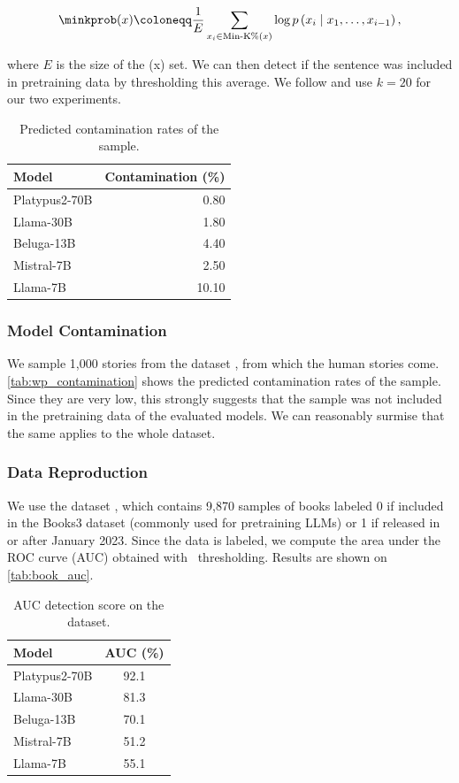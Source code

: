 \[ \minkprob (x) \coloneqq \frac{1}{E} \sum_{x_i \in \textrm{Min-K\%}(x)} \log p \left(x_i \mid x_1, \dots, x_{i-1} \right) ,\]

where $E$ is the size of the \mink(x) set. We can then detect if the sentence was included in pretraining data by thresholding this average. We follow \citet{shi2023detecting} and use $k=20$ for our two experiments.

\begin{table}[h]
\centering
\begin{tabular}{lr}
\toprule
\textbf{Model} & \textbf{Contamination (\%)} \\
\midrule
Platypus2-70B & 0.80 \\
Llama-30B & 1.80 \\
Beluga-13B & 4.40\\
Mistral-7B & 2.50 \\
Llama-7B & 10.10\\
\bottomrule
\end{tabular}
\caption{Predicted contamination rates of the {\wpfan} sample.}
\label{tab:wp_contamination}
\end{table}

\subsubsection{Model Contamination} 

We sample 1,000 stories from the {\wpfan} dataset \citep{fan2018hierarchical}, from which the {\hanna} human stories come. \autoref{tab:wp_contamination} shows the predicted contamination rates of the {\wpfan} sample. Since they are very low, this strongly suggests that the {\wpfan} sample was not included in the pretraining data of the evaluated models. We can reasonably surmise that the same applies to the whole {\wpfan} dataset.

\subsubsection{Data Reproduction}

We use the {\booksmia} dataset \citep{shi2023detecting}, which contains 9,870 samples of books labeled 0 if included in the Books3 dataset (commonly used for pretraining LLMs) or 1 if released in or after January 2023. Since the {\booksmia} data is labeled, we compute the area under the ROC curve (AUC) obtained with \minkprob\ thresholding. Results are shown on \autoref{tab:book_auc}.

\begin{table}[h]
\centering
\begin{tabular}{lc}
\toprule
\textbf{Model} & \textbf{AUC (\%)} \\
\midrule
Platypus2-70B & 92.1 \\
Llama-30B & 81.3 \\
Beluga-13B & 70.1\\
Mistral-7B & 51.2 \\
Llama-7B & 55.1 \\
\bottomrule
\end{tabular}
\caption{AUC detection score on the {\booksmia} dataset.}
\label{tab:book_auc}
\end{table}

